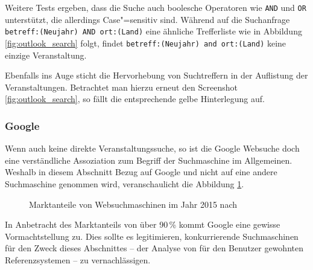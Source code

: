 Weitere Tests ergeben, dass die Suche auch boolesche Operatoren wie \texttt{AND} und \texttt{OR} unterstützt, die allerdings Case"=sensitiv sind. Während auf die Suchanfrage \texttt{betreff:(Neujahr) AND ort:(Land)} eine ähnliche Trefferliste wie in Abbildung \ref{fig:outlook_search} folgt, findet \texttt{betreff:(Neujahr) and ort:(Land)} keine einzige Veranstaltung.

Ebenfalls ins Auge sticht die Hervorhebung von Suchtreffern in der Auflistung der Veranstaltungen. Betrachtet man hierzu erneut den Screenshot \ref{fig:outlook_search}, so fällt die entsprechende gelbe Hinterlegung auf.

\subsubsection{Google}

Wenn auch keine direkte Veranstaltungssuche, so ist die Google Websuche doch eine verständliche Assoziation zum Begriff der Suchmaschine im Allgemeinen. Weshalb in diesem Abschnitt Bezug auf Google und nicht auf eine andere Suchmaschine genommen wird, veranschaulicht die Abbildung \ref{fig:websearchengines.market}.


\begin{figure}[ht!]
\begin{margincap}
	\centering
	\caption[Marktanteile von Websuchmaschinen im Jahr 2015]{ Marktanteile von Websuchmaschinen im Jahr 2015 nach \cite[S. 31]{StatistaGmbH.September2014}}
	\label{fig:websearchengines.market}
\end{margincap}
\end{figure}

In Anbetracht des Marktanteils von über 90\,\% kommt Google eine gewisse Vormachtstellung zu. Dies sollte es legitimieren, konkurrierende Suchmaschinen für den Zweck dieses Abschnittes -- der Analyse von für den Benutzer gewohnten Referenzsystemen -- zu vernachlässigen.

